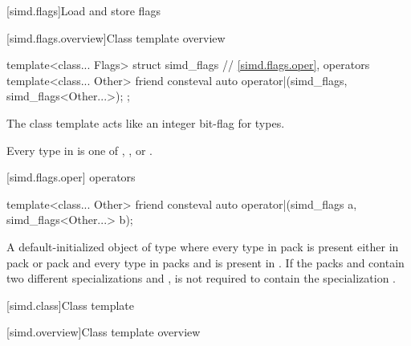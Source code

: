 [simd.flags]{Load and store flags}

[simd.flags.overview]{Class template  overview}


\begin{codeblock}
template<class... Flags> struct simd_flags {
  // \ref{simd.flags.oper},  operators
  template<class... Other>
    friend consteval auto operator|(simd_flags, simd_flags<Other...>);
};
\end{codeblock}

\pnum
\begin{note}
The class template  acts like an integer bit-flag for types.
\end{note}

\pnum\constraints
Every type in  is one of \tcode{\convertflag},
\tcode{\alignedflag}, or .

[simd.flags.oper]{ operators}

\begin{itemdecl}
template<class... Other>
  friend consteval auto operator|(simd_flags a, simd_flags<Other...> b);
\end{itemdecl}

\begin{itemdescr}
  \pnum\returns
  A default-initialized object of type  where
  every type in pack  is present either in pack  or
  pack  and every type in packs  and  is
  present in .
  If the packs  and  contain two
  different specializations  and
  ,  is not required to contain the
  specialization .
\end{itemdescr}

[simd.class]{Class template }

[simd.overview]{Class template  overview}

